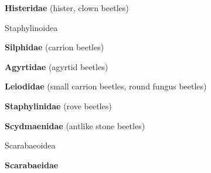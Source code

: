 \documentclass[letterpaper,10pt]{article}
\begin{document}
{\makebox[0.6cm]{}  \textbf{Histeridae} (hister, clown beetles) \par
\makebox[0.40cm]{}  Staphylinoidea \par
\makebox[0.6cm]{}  \textbf{Silphidae} (carrion beetles) \par
\makebox[0.6cm]{}  \textbf{Agyrtidae} (agyrtid beetles) \par
\makebox[0.6cm]{}  \textbf{Leiodidae} (small carrion beetles, round fungus beetles) \par
\makebox[0.6cm]{}  \textbf{Staphylinidae} (rove beetles) \par
\makebox[0.6cm]{}  \textbf{Scydmaenidae} (antlike stone beetles) \par
\makebox[0.40cm]{}  Scarabaeoidea \par
\makebox[0.6cm]{}  \textbf{Scarabaeidae} \par
}
\end{document}

